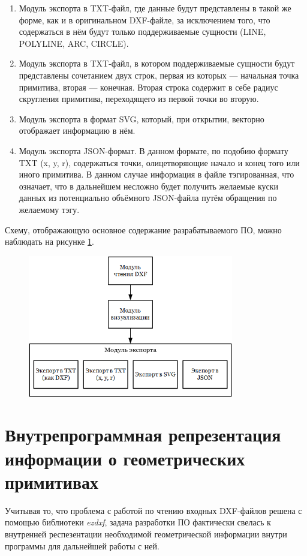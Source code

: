 \begin{enumerate}
	\item Модуль экспорта в TXT-файл, где данные будут представлены в такой же форме, как и в оригинальном DXF-файле, за исключением того, что содержаться в нём будут только поддерживаемые сущности (LINE, POLYLINE, ARC, CIRCLE).
	\item Модуль экспорта в TXT-файл, в котором поддерживаемые сущности будут представлены сочетанием двух строк, первая из которых --- начальная точка примитива, вторая --- конечная. Вторая строка содержит в себе радиус скругления примитива, переходящего из первой точки во вторую.
	\item Модуль экспорта в формат SVG, который, при открытии, векторно отображает информацию в нём.
	\item Модуль экспорта JSON-формат. В данном формате, по подобию формату TXT (x, y, r), содержаться точки, олицетворяющие начало и конец того или иного примитива. В данном случае информация в файле тэгированная, что означает, что в дальнейшем несложно будет получить желаемые куски данных из потенциально объёмного JSON-файла путём обращения по желаемому тэгу.
\end{enumerate}


Схему, отображающую основное содержание разрабатываемого ПО, можно наблюдать на рисунке \ref{fig:organisationsdiagramm}.

\begin{figure}[H]
	\centering
	\includegraphics[width=0.8\textwidth]{figures/organisationsdiagramm.png}
	\label{fig:organisationsdiagramm}
\end{figure}

\section{Внутрепрограммная репрезентация информации о геометрических примитивах}
Учитывая то, что проблема с работой по чтению входных DXF-файлов решена с помощью библиотеки \textit{ezdxf}, задача разработки ПО фактически свелась к внутренней респезентации необходимой геометрической информации внутри программы для дальнейшей работы с ней.

